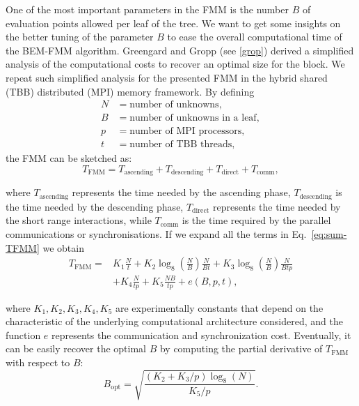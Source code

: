 One of the most important parameters in the FMM is the number $B$ of evaluation points allowed per leaf of the tree. We want to get some insights on the better tuning of the parameter $B$ to ease the overall computational time of the BEM-FMM algorithm. Greengard and Gropp (see \ref{grop}) derived a simplified analysis of the computational costs to recover an optimal size for the block. We repeat such simplified analysis for the presented FMM in the hybrid shared (TBB) distributed (MPI) memory framework. By defining
\begin{equation*}
\begin{aligned}
N & = \text{number of unknowns}, \\
B & = \text{number of unknowns in a leaf}, \\
p & = \text{number of MPI processors}, \\
t & = \text{number of TBB threads}, 
\end{aligned}
\end{equation*}
the FMM can be sketched as:
\begin{equation}
\label{eq:sum-TFMM}
T_{\text{FMM}} = T_{\text{ascending}} + T_{\text{descending}} + T_{\text{direct}} + T_{\text{comm}},
\end{equation}

where $T_{\text{ascending}}$ represents the time needed by the ascending phase, $T_{\text{descending}}$ is the time needed by the descending phase, $T_{\text{direct}}$ represents the time needed by the short range interactions, while $T_{\text{comm}}$ is the time required by the parallel communications or
synchronisations. If we expand all the terms in Eq.~\eqref{eq:sum-TFMM} we obtain
\begin{equation}
\label{eq:complex-T-formula}
\begin{aligned}
T_{\text{FMM}} =& K_1 \frac{N}{t}+K_2\log_8\left( \frac{N}{B}  \right)\frac{N}{Bt}+K_3\log_8  \left( \frac{N}{B}  \right)\frac{N}{Btp} \\
& +K_4\frac{N}{tp}+K_5\frac{NB}{tp} + e(B,p,t),
\end{aligned}
\end{equation}

where $K_1, K_2, K_3, K_4, K_5$ are experimentally constants that depend on the characteristic of the underlying computational architecture considered, and the function $e$ represents the communication and synchronization cost. Eventually, it can be
easily recover the optimal $B$ by computing the partial derivative of $T_{\text{FMM}}$ with respect to $B$:
\begin{equation}
B_{\text{opt}}=\sqrt{\frac{(K_2+K_3/p)\log_8(N)}{K_5/p} }.
\end{equation}

